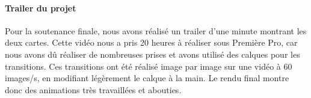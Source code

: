         \paragraph{Trailer du projet}

        Pour la soutenance finale, nous avons réalisé un trailer d'une minute montrant les deux cartes. Cette vidéo nous a pris 
        20 heures à réaliser sous Première Pro, car nous avons dû réaliser de nombreuses prises et avons utilisé des calques 
        pour les transitions. Ces transitions ont été réalisé image par image sur une vidéo à 60 images/s, en modifiant légèrement 
        le calque à la main. Le rendu final montre donc des animations très travaillées et abouties.